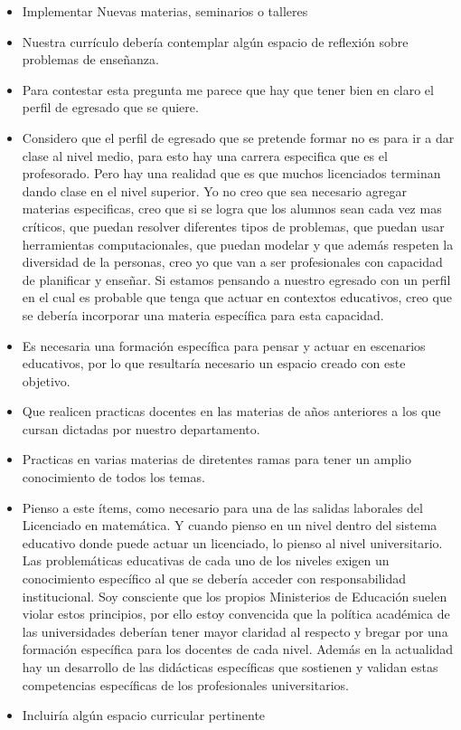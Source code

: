 \documentclass[a4paper,10pt,BCOR10mm,oneside,headsepline]{scrbook}
\begin{document}
\begin{subappendices}
\begin{itemize}
\item  Implementar Nuevas materias, seminarios o talleres

\item  Nuestra currículo debería contemplar algún espacio de reflexión sobre problemas de enseñanza. 

\item  Para contestar esta pregunta me parece que hay que tener bien en claro el perfil de egresado que se quiere.

\item  Considero que el perfil de egresado que se pretende formar no es para ir a dar clase al nivel medio, para esto hay una carrera especifica que es el profesorado. Pero hay una realidad que es que muchos licenciados terminan dando clase en el nivel superior. Yo no creo que sea necesario agregar materias especificas, creo que si se logra que los alumnos sean cada vez mas críticos, que puedan resolver diferentes tipos de problemas, que puedan usar herramientas computacionales, que puedan modelar y que además respeten la diversidad de la personas,  creo yo que van a ser profesionales con capacidad de planificar y enseñar.
Si estamos pensando a nuestro egresado con un perfil en el cual es probable que tenga que actuar en contextos educativos, creo que se debería incorporar una materia específica para esta capacidad.

\item  Es necesaria una formación específica para pensar y actuar en escenarios educativos, por lo que resultaría necesario un espacio creado con este objetivo.

\item  Que realicen practicas docentes en las materias de años anteriores a los que cursan dictadas por nuestro departamento. 

\item Practicas en varias materias de diretentes ramas para tener un amplio conocimiento de todos los temas.

\item Pienso a este ítems, como necesario para una de las salidas laborales del Licenciado en matemática. Y cuando pienso en un nivel dentro del sistema educativo donde puede actuar un licenciado, lo pienso al nivel universitario. Las problemáticas educativas de cada uno de los niveles exigen un conocimiento específico al que se debería acceder con responsabilidad institucional. Soy consciente que los propios Ministerios de Educación suelen violar estos principios, por ello estoy convencida que la política académica de las universidades deberían  tener mayor claridad al respecto y bregar por una formación específica para los docentes de cada nivel. Además en la actualidad hay un desarrollo de las didácticas específicas que sostienen y validan estas competencias específicas de los profesionales universitarios.
\item Incluiría algún espacio curricular pertinente
\end{itemize}





\end{subappendices}
\end{document}
